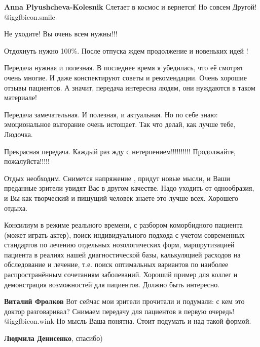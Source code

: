 \begin{itemize}
\begin{itemize}
\textbf{Anna Plyushcheva-Kolesnik} Слетает в космос и вернется! Но совсем Другой!  @igg{fbicon.smile} 
\end{itemize} %

Не уходите! Вы очень всем нужны!!!

Отдохнуть нужно 100\%. После отпуска ждем продолжение и новеньких идей !


Передача нужная и полезная. В последнее время я убедилась, что её смотрят очень
многие. И даже конспектируют советы и рекомендации. Очень хорошие отзывы
пациентов. А значит, передача интересна людям, они нуждаются в таком материале!


Передача замечательная. И полезная, и актуальная. Но по себе знаю:
эмоциональное выгорание очень истощает. Так что делай, как лучше тебе, Людочка.


Прекрасная передача. Каждый раз жду с нетерпением!!!!!!!!!!
Продолжайте, пожалуйста!!!!!


Отдых необходим. Снимется напряжение , придут новые мысли, и Ваши преданные
зрители увидят Вас в другом качестве. Надо уходить от однообразия, и Вы как
творческий и пишущий человек знаете это лучше всех. Хорошего отдыха.


Консилиум в режиме реального времени, с разбором коморбидного пациента (может
играть актер), поиск индивидуального подхода с учетом современных стандартов по
лечению отдельных нозологических форм, маршрутизацией пациента в реалиях нашей
диагностической базы, калькуляцией расходов на обследование и лечение, т.е.
поиск оптимальных вариантов по наиболее распространённым сочетаниям
заболеваний. Хороший пример для коллег и демонстрация возможностей для
пациентов. Должно быть интересно.

\begin{itemize} %
\textbf{Виталий Фролков} Вот сейчас мои зрители прочитали и подумали: с кем это доктор разговаривал? Снимаем передачу для пациентов в первую очередь!  @igg{fbicon.wink}  Но мысль Ваша понятна. Стоит подумать и над такой формой.

\textbf{Людмила Денисенко}, спасибо)
\end{itemize} %


\end{itemize}
